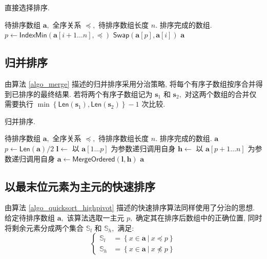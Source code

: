 \documentclass[12pt]{article}
\begin{document}
\begin{algorithm}
\caption{直接选择排序.}
\label{algo_straight_selection}
\begin{algorithmic}[1]
\Require 待排序数组 $\bm{a},$ 全序关系 $\preceq,$ 待排序数组长度 $n.$
\Ensure 排序完成的数组.
    \State $p \gets \mathsf{IndexMin}(\bm{a}[i+1 \dots n], \preceq)$
    \State $\mathsf{Swap}(\bm{a}[p], \bm{a}[i])$
\EndFor
\State \Return $\bm{a}$
\end{algorithmic}
\end{algorithm}

\subsection{归并排序}

由算法 \ref{algo_merge} 描述的归并排序采用分治策略, 将每个有序子数组按序合并得到已排序的最终结果. 若将两个有序子数组记为 $\bm{s}_1$ 和 $\bm{s}_2,$ 对这两个数组的合并仅需要执行 $\min \left\{\textsf{Len}(\bm{s}_1), \textsf{Len}(\bm{s}_2)\right\} - 1$ 次比较.

\begin{algorithm}
\caption{归并排序.}
\label{algo_merge}
\begin{algorithmic}[1]
\Require 待排序数组 $\bm{a},$ 全序关系 $\preceq,$ 待排序数组长度 $n.$
\Ensure 排序完成的数组.
    \State \Return $\bm{a}$
\EndIf
\State $p \gets \mathsf{Len}(\bm{a}) / 2$
\State $\bm{l} \gets$ 以 $\bm{a}[1 \dots p]$ 为参数递归调用自身
\State $\bm{h} \gets$ 以 $\bm{a}[p+1 \dots n]$ 为参数递归调用自身
\State $\bm{a} \gets \mathsf{MergeOrdered}(\bm{l}, \bm{h})$
\State \Return $\bm{a}$
\end{algorithmic}
\end{algorithm}

\subsection{以最末位元素为主元的快速排序}

由算法 \ref{algo_quicksort_highpivot} 描述的快速排序算法同样使用了分治的思想. 给定待排序数组 $\bm{a},$ 该算法选取一主元 $p,$ 确定其在排序后数组中的正确位置, 同时将剩余元素分成两个集合 $\mathbb{S}_l$ 和 $\mathbb{S}_h,$ 满足:
\begin{equation}
  \left\{
    \begin{aligned}
        \mathbb{S}_l & = \left\{x \in \bm{a}\ \vert\ x \preceq p \right\} \\
        \mathbb{S}_h & = \left\{x \in \bm{a}\ \vert\ x \npreceq p \right\}
    \end{aligned}
  \right.
\end{equation}
\end{document}
